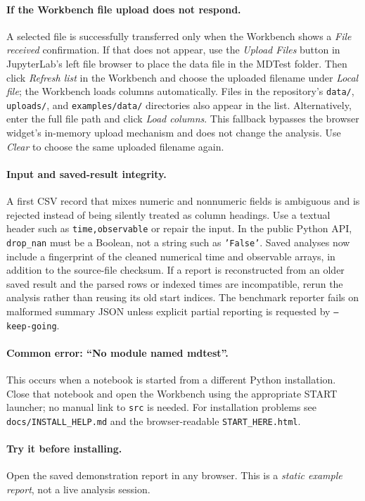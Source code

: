 \documentclass[11pt,oneside]{report}
\begin{document}
\paragraph{If the Workbench file upload does not respond.} A selected file is successfully transferred only when the Workbench shows a \emph{File received} confirmation. If that does not appear, use the \emph{Upload Files} button in JupyterLab's left file browser to place the data file in the MDTest folder. Then click \emph{Refresh list} in the Workbench and choose the uploaded filename under \emph{Local file}; the Workbench loads columns automatically. Files in the repository's \texttt{data/}, \texttt{uploads/}, and \texttt{examples/data/} directories also appear in the list. Alternatively, enter the full file path and click \emph{Load columns}. This fallback bypasses the browser widget's in-memory upload mechanism and does not change the analysis. Use \emph{Clear} to choose the same uploaded filename again.


\paragraph{Input and saved-result integrity.} A first CSV record that mixes
numeric and nonnumeric fields is ambiguous and is rejected instead of being
silently treated as column headings. Use a textual header such as
\texttt{time,observable} or repair the input. In the public Python API,
\texttt{drop\_nan} must be a Boolean, not a string such as \texttt{'False'}.
Saved analyses now include a fingerprint of the cleaned numerical time and
observable arrays, in addition to the source-file checksum. If a report is
reconstructed from an older saved result and the parsed rows or indexed times
are incompatible, rerun the analysis rather than reusing its old start indices.
The benchmark reporter fails on malformed summary JSON unless explicit
partial reporting is requested by \texttt{--keep-going}.

\paragraph{Common error: ``No module named mdtest''.} This occurs when a notebook is started from a different Python installation. Close that notebook and open the Workbench using the appropriate START launcher; no manual link to \texttt{src} is needed. For installation problems see \texttt{docs/INSTALL\_HELP.md} and the browser-readable \texttt{START\_HERE.html}.

\paragraph{Try it before installing.} Open the saved demonstration report  in any browser. This is a \emph{static example report}, not a live analysis session.
\clearpage
\end{document}
